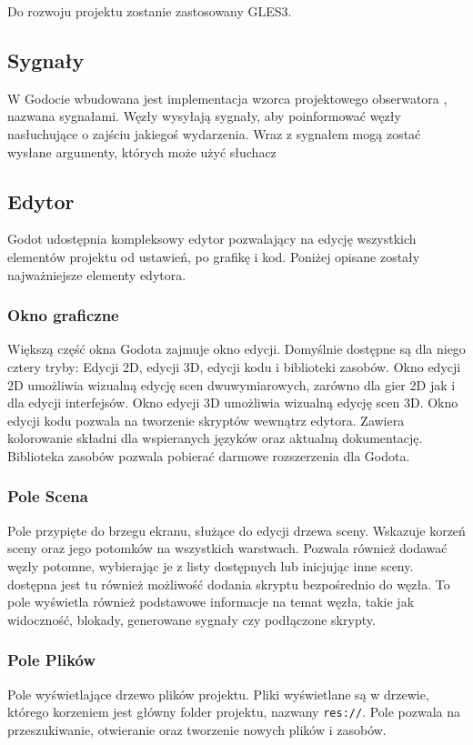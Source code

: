 Do rozwoju projektu zostanie zastosowany GLES3.

\subsection{Sygnały}
W Godocie wbudowana jest implementacja wzorca projektowego obserwatora \cite{game_programming_patterns}, nazwana sygnałami. Węzły wysyłają sygnały, aby poinformować węzły nasłuchujące o zajściu jakiegoś wydarzenia. Wraz z sygnałem mogą zostać wysłane argumenty, których może użyć słuchacz

\subsection{Edytor}
Godot udostępnia kompleksowy edytor pozwalający na edycję wszystkich elementów projektu od ustawień, po grafikę i kod. Poniżej opisane zostały najważniejsze elementy edytora.

\subsubsection{Okno graficzne}
Większą część okna Godota zajmuje okno edycji. Domyślnie dostępne są dla niego cztery tryby: Edycji 2D, edycji 3D, edycji kodu i biblioteki zasobów. Okno edycji 2D umożliwia wizualną edycję scen dwuwymiarowych, zarówno dla gier 2D jak i dla edycji interfejsów. Okno edycji 3D umożliwia wizualną edycję scen 3D. Okno edycji kodu pozwala na tworzenie skryptów wewnątrz edytora. Zawiera kolorowanie składni dla wspieranych języków oraz aktualną dokumentację. Biblioteka zasobów pozwala pobierać darmowe rozszerzenia dla Godota.

\subsubsection{Pole Scena}
Pole przypięte do brzegu ekranu, służące do edycji drzewa sceny. Wskazuje korzeń sceny oraz jego potomków na wszystkich warstwach. Pozwala również dodawać węzły potomne, wybierając je z listy dostępnych lub inicjując inne sceny. dostępna jest tu również możliwość dodania skryptu bezpośrednio do węzła. To pole wyświetla również podstawowe informacje na temat węzła, takie jak widoczność, blokady, generowane sygnały czy podłączone skrypty.

\subsubsection{Pole Plików}
Pole wyświetlające drzewo plików projektu. Pliki wyświetlane są w drzewie, którego korzeniem jest główny folder projektu, nazwany \texttt{res://}. Pole pozwala na przeszukiwanie, otwieranie oraz tworzenie nowych plików i zasobów.

